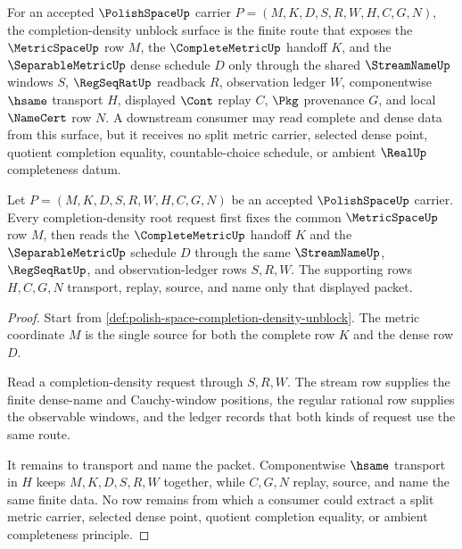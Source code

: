 \begin{definition}
\label{def:polish-space-completion-density-unblock}
For an accepted $\PolishSpaceUp$ carrier
$P=(M,K,D,S,R,W,H,C,G,N)$, the completion-density unblock surface is the
finite route that exposes the $\MetricSpaceUp$ row $M$, the
$\CompleteMetricUp$ handoff $K$, and the $\SeparableMetricUp$ dense schedule
$D$ only through the shared $\StreamNameUp$ windows $S$, $\RegSeqRatUp$
readback $R$, observation ledger $W$, componentwise $\hsame$ transport $H$,
displayed $\Cont$ replay $C$, $\Pkg$ provenance $G$, and local $\NameCert$
row $N$. A downstream consumer may read complete and dense data from this
surface, but it receives no split metric carrier, selected dense point,
quotient completion equality, countable-choice schedule, or ambient
$\RealUp$ completeness datum.
\end{definition}

\begin{theorem}
\label{thm:polish-space-completion-density-obligation}
Let $P=(M,K,D,S,R,W,H,C,G,N)$ be an accepted $\PolishSpaceUp$ carrier. Every
completion-density root request first fixes the common $\MetricSpaceUp$ row
$M$, then reads the $\CompleteMetricUp$ handoff $K$ and the
$\SeparableMetricUp$ schedule $D$ through the same $\StreamNameUp$,
$\RegSeqRatUp$, and observation-ledger rows $S,R,W$. The supporting rows
$H,C,G,N$ transport, replay, source, and name only that displayed packet.
\end{theorem}
\begin{proof}
Start from \autoref{def:polish-space-completion-density-unblock}. The metric
coordinate $M$ is the single source for both the complete row $K$ and the
dense row $D$.

Read a completion-density request through $S,R,W$. The stream row supplies
the finite dense-name and Cauchy-window positions, the regular rational row
supplies the observable windows, and the ledger records that both kinds of
request use the same route.

It remains to transport and name the packet. Componentwise $\hsame$ transport
in $H$ keeps $M,K,D,S,R,W$ together, while $C,G,N$ replay, source, and name
the same finite data. No row remains from which a consumer could extract a
split metric carrier, selected dense point, quotient completion equality, or
ambient completeness principle.
\end{proof}

